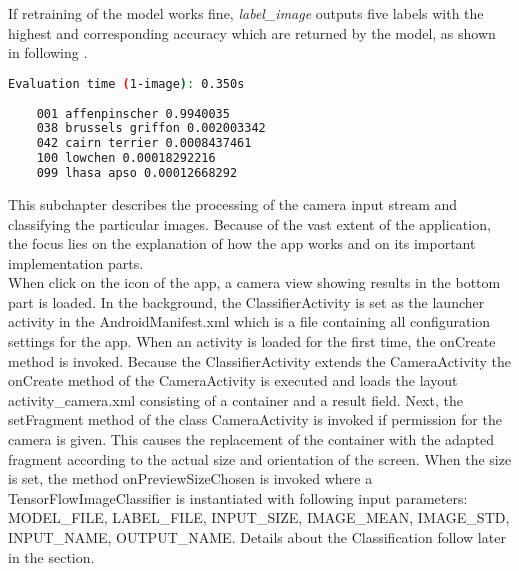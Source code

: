 If retraining of the model works fine, \textit{label\_image} outputs five labels with the highest and corresponding accuracy which are returned by the model, as shown in following .
\begin{lstlisting}[caption=Output of \textit{label\_image.py}, label=list:label_imageOutput, language=bash]
	Evaluation time (1-image): 0.350s
	
	001 affenpinscher 0.9940035
	038 brussels griffon 0.002003342
	042 cairn terrier 0.0008437461
	100 lowchen 0.00018292216
	099 lhasa apso 0.00012668292
\end{lstlisting}

This subchapter describes the processing of the camera input stream and classifying the particular images. Because of the vast extent of the application, the focus lies on the explanation of how the app works and on its important implementation parts. \\

When click on the icon of the app, a camera view showing results in the bottom part is loaded. In the background, the ClassifierActivity is set as the launcher activity in the AndroidManifest.xml which is a file containing all configuration settings for the app. When an activity is loaded for the first time, the onCreate method is invoked. Because the ClassifierActivity extends the CameraActivity the onCreate method of the CameraActivity is executed and loads the layout activity_camera.xml consisting of a container and a result field. Next, the setFragment method of the class CameraActivity is invoked if permission for the camera is given. This causes the replacement of the container with the adapted fragment according to the actual size and orientation of the screen. When the size is set, the method onPreviewSizeChosen is invoked where a TensorFlowImageClassifier is instantiated with following input parameters: MODEL_FILE, LABEL_FILE, INPUT_SIZE, IMAGE_MEAN, IMAGE_STD, INPUT_NAME, OUTPUT_NAME. Details about the Classification follow later in the section.\\

